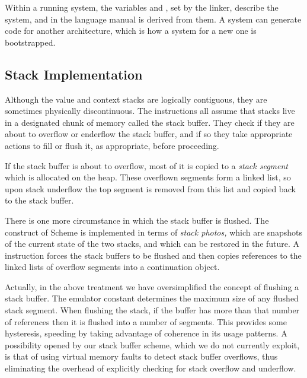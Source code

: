 Within a running system, the variables  and
, set by the linker, describe the
system, and  in the language manual is
derived from them.  A system can generate code for another
architecture, which is how a system for a new one is bootstrapped.


\subsection{Stack Implementation} \label{sec:stackimpl}

Although the value and context stacks are logically contiguous, they
are sometimes physically discontinuous.  The instructions all assume
that stacks live in a designated chunk of memory called the stack
buffer.  They check if they are about to overflow or enderflow the
stack buffer, and if so they take appropriate actions to fill or flush
it, as appropriate, before proceeding.

If the stack buffer is about to overflow, most of it is copied to a
\emph{stack segment} which is allocated on the heap.  These overflown
segments form a linked list, so upon stack underflow the top segment
is removed from this list and copied back to the stack buffer.

There is one more circumstance in which the stack buffer is flushed.
The  construct of Scheme \citep{R3RS} is implemented in
terms of \emph{stack photos,} which are snapshots of the current state
of the two stacks, and which can be restored in the future.  A
 instruction forces the stack buffers to be
flushed and then copies references to the linked lists of overflow
segments into a continuation object.

Actually, in the above treatment we have oversimplified the concept of
flushing a stack buffer.  The emulator constant
 determines the maximum size of
any flushed stack segment.  When flushing the stack, if the buffer has
more than that number of references then it is flushed into a number
of segments.  This provides some hysteresis, speeding  by
taking advantage of coherence in its usage patterns.  A possibility
opened by our stack buffer scheme, which we do not currently exploit,
is that of using virtual memory faults to detect stack buffer
overflows, thus eliminating the overhead of explicitly checking for
stack overflow and underflow.

